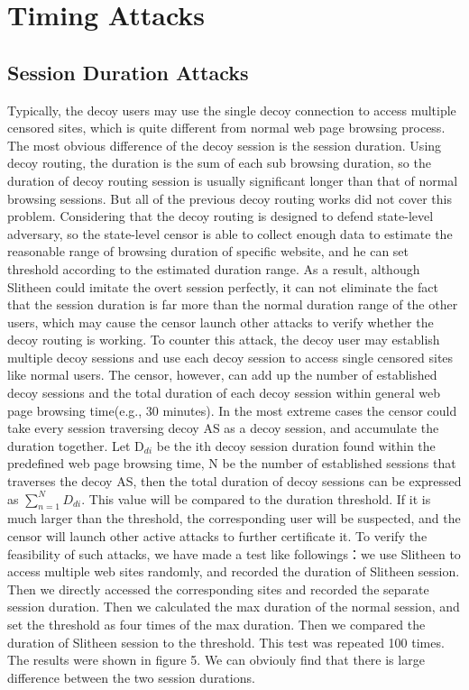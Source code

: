 \documentclass[conference]{IEEEtran}
\begin{document}
\section{Timing Attacks}
\subsection{Session Duration Attacks}
Typically, the decoy users may use the single decoy connection to access multiple censored sites, which is quite different from normal web page browsing process. The most obvious difference of the decoy session is the session duration. Using decoy routing, the duration is the sum of each sub browsing duration, so the duration of decoy routing session is usually significant longer than that of normal browsing sessions. But all of the previous decoy routing works did not cover this problem. Considering that the decoy routing is designed to defend state-level adversary, so the state-level censor is able to collect enough data to estimate the reasonable range of browsing duration of specific website, and he can set threshold according to the estimated duration range. As a result, although Slitheen could imitate the overt session perfectly, it can not eliminate the fact that the session duration is far more than the normal duration range of the other users, which may cause the censor launch other attacks to verify whether the decoy routing is working. To counter this attack, the decoy user may establish multiple decoy sessions and use each decoy session to access single censored sites like normal users. The censor, however, can add up the number of established decoy sessions and the total duration of each decoy session within general web page browsing time(e.g., 30 minutes). In the most extreme cases the censor could take every session traversing decoy AS as a decoy session, and accumulate the duration together. Let D$_{di}$ be the ith decoy session duration found within the predefined web page browsing time, N be the number of established sessions that traverses the decoy AS, then the total duration of decoy sessions can be expressed as $\sum_{n=1}^ND_{di}$. This value will be compared to the duration threshold. If it is much larger than the threshold, the corresponding user will be suspected, and the censor will launch other active attacks to further certificate it. To verify the feasibility of such attacks, we have made a test like followings：we use Slitheen to access multiple web sites randomly, and recorded the duration of Slitheen session. Then we directly accessed the corresponding sites and recorded the separate session duration. Then we calculated the max duration of the normal session, and set the threshold as four times of the max duration. Then we compared the duration of Slitheen session to the threshold. This test was repeated 100 times. The results were shown in figure 5. We can obviouly find that there is large difference between the two session durations.
\end{document}
